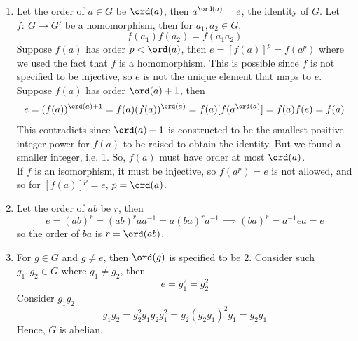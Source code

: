 \documentclass[a4paper]{article}
\begin{document}
\begin{ans}\leavevmode
\begin{enumerate}[label=(\alph*)]
\item Let the order of $a\in G$ be $\ord(a)$, then $a^{\ord(a)}=e$, the identity of $G$. Let $f:~G\rightarrow G'$ be a homomorphism, then for $a_1,a_2\in G$,
$$f(a_1)f(a_2)=f(a_1a_2)$$
Suppose $f(a)$ has order $p<\ord(a)$, then $e=[f(a)]^p=f(a^p)$ where we used the fact that $f$ is a homomorphism. This is possible since $f$ is not specified to be injective, so $e$ is not the unique element that maps to $e$.\\[5pt]
Suppose $f(a)$ has order $\ord(a)+1$, then
$$e=(f(a))^{\ord(a)+1}=f(a)(f(a))^{\ord(a)}=f(a)[f(a^{\ord(a)}]=f(a)f(e)=f(a)$$
This contradicts since $\ord(a)+1$ is constructed to be the smallest positive integer power for $f(a)$ to be raised to obtain the identity. But we found a smaller integer, i.e. 1. So, $f(a)$ must have order at most $\ord(a)$.\\[5pt]
If $f$ is an isomorphism, it must be injective, so $f(a^p)=e$ is not allowed, and so for $[f(a)]^p=e$, $p=\ord(a)$.
\item Let the order of $ab$ be $r$, then
$$e=(ab)^r=(ab)^raa^{-1}=a(ba)^ra^{-1}\implies(ba)^r=a^{-1}ea=e$$
so the order of $ba$ is $r=\ord(ab)$.
\item For $g\in G$ and $g\neq e$, then $\ord(g)$ is specified to be 2. Consider such $g_1,g_2\in G$ where $g_1\neq g_2$, then
$$e=g_1^2=g_2^2$$
Consider $g_1g_2$
$$g_1g_2=g_2^2g_1g_2g_1^2=g_2(g_2g_1)^2g_1=g_2g_1$$
Hence, $G$ is abelian.
\end{enumerate}
\end{ans}
\newpage
\end{document}
